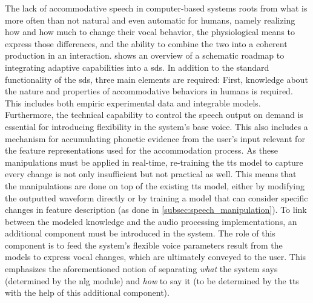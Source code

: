 The lack of accommodative speech in computer-based systems roots from what is more often than not natural and even automatic for humans, namely realizing how and how much to change their vocal behavior, the physiological means to express those differences, and the ability to combine the two into a coherent production in an interaction.
 shows an overview of a schematic roadmap to integrating adaptive capabilities into a \ac{sds}.
In addition to the standard functionality of the \ac{sds}, three main elements are required:
First, knowledge about the nature and properties of accommodative behaviors in humans is required.
This includes both empiric experimental data and integrable models.
Furthermore, the technical capability to control the speech output on demand is essential for introducing flexibility in the system's base voice.
This also includes a mechanism for accumulating phonetic evidence from the user's input relevant for the feature representations used for the accommodation process.
As these manipulations must be applied in real-time, re-training the \ac{tts} model to capture every change is not only insufficient but not practical as well.
This means that the manipulations are done on top of the existing \ac{tts} model, either by modifying the outputted waveform directly or by training a model that can consider specific changes in feature description (as done in \cref{subsec:speech_manipulation}).
To link between the modeled knowledge and the audio processing implementations, an additional component must be introduced in the system.
The role of this component is to feed the system's flexible voice parameters result from the models to express vocal changes, which are ultimately conveyed to the user.
This emphasizes the aforementioned notion of separating \emph{what} the system says (determined by the \ac{nlg} module) and \emph{how} to say it (to be determined by the \ac{tts} with the help of this additional component).

